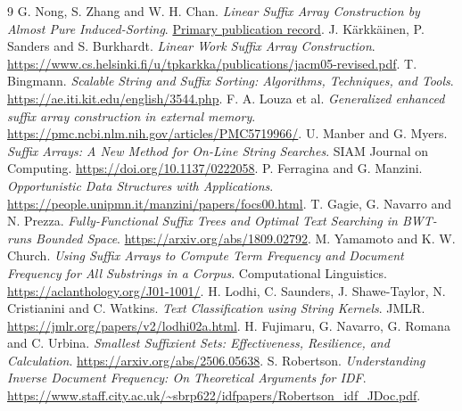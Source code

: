 \documentclass[10pt]{article}
\begin{document}
\begin{thebibliography}{9}
 G. Nong, S. Zhang and W. H. Chan. \emph{Linear Suffix Array Construction
by Almost Pure Induced-Sorting}. \href{https://scholars.hkbu.edu.hk/en/publications/linear-suffix-array-construction-by-almost-pure-induced-sorting/}{Primary publication record}.
 J. K\"arkk\"ainen, P. Sanders and S. Burkhardt. \emph{Linear Work Suffix Array
Construction}. \url{https://www.cs.helsinki.fi/u/tpkarkka/publications/jacm05-revised.pdf}.
 T. Bingmann. \emph{Scalable String and Suffix Sorting: Algorithms,
Techniques, and Tools}. \url{https://ae.iti.kit.edu/english/3544.php}.
 F. A. Louza et al. \emph{Generalized enhanced suffix array construction in
external memory}. \url{https://pmc.ncbi.nlm.nih.gov/articles/PMC5719966/}.
 U. Manber and G. Myers. \emph{Suffix Arrays: A New Method for On-Line String Searches}.
SIAM Journal on Computing. \url{https://doi.org/10.1137/0222058}.
 P. Ferragina and G. Manzini. \emph{Opportunistic Data Structures with Applications}.
\url{https://people.unipmn.it/manzini/papers/focs00.html}.
 T. Gagie, G. Navarro and N. Prezza. \emph{Fully-Functional Suffix Trees and Optimal
Text Searching in BWT-runs Bounded Space}. \url{https://arxiv.org/abs/1809.02792}.
 M. Yamamoto and K. W. Church. \emph{Using Suffix Arrays to Compute Term Frequency and
Document Frequency for All Substrings in a Corpus}. Computational Linguistics.
\url{https://aclanthology.org/J01-1001/}.
 H. Lodhi, C. Saunders, J. Shawe-Taylor, N. Cristianini and C. Watkins. \emph{Text
Classification using String Kernels}. JMLR. \url{https://jmlr.org/papers/v2/lodhi02a.html}.
 H. Fujimaru, G. Navarro, G. Romana and C. Urbina. \emph{Smallest Suffixient
Sets: Effectiveness, Resilience, and Calculation}. \url{https://arxiv.org/abs/2506.05638}.
 S. Robertson. \emph{Understanding Inverse Document Frequency: On Theoretical Arguments
for IDF}. \url{https://www.staff.city.ac.uk/~sbrp622/idfpapers/Robertson_idf_JDoc.pdf}.
\end{thebibliography}
\end{document}
